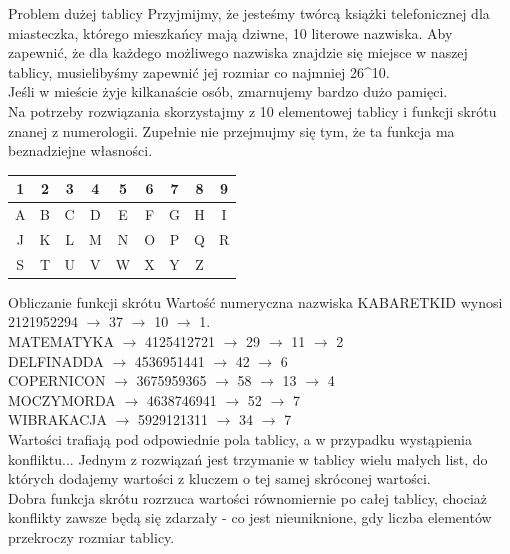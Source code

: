 \begin{frame}{Problem dużej tablicy}
    Przyjmijmy, że jesteśmy twórcą książki telefonicznej dla miasteczka, którego mieszkańcy mają
    dziwne, 10 literowe nazwiska. Aby zapewnić, że dla każdego możliwego nazwiska znajdzie się
    miejsce w naszej tablicy, musielibyśmy zapewnić jej rozmiar co najmniej 26^{10}. \\
    Jeśli w mieście żyje kilkanaście osób, zmarnujemy bardzo dużo pamięci. \\
    Na potrzeby rozwiązania skorzystajmy z 10 elementowej tablicy i funkcji skrótu znanej z numerologii.
    Zupełnie nie przejmujmy się tym, że ta funkcja ma beznadziejne własności.
    \begin{table}
        \centering
        \begin{tabular}{|c|c|c|c|c|c|c|c|c|}
            \hline
            1 & 2 & 3 & 4 & 5 & 6 & 7 & 8 & 9 \\
            \hline
            A & B & C & D & E & F & G & H & I \\
            J & K & L & M & N & O & P & Q & R \\
            S & T & U & V & W & X & Y & Z & \\
            \hline
        \end{tabular}
    \end{table}
\end{frame}
\begin{frame}{Obliczanie funkcji skrótu}
    Wartość numeryczna nazwiska KABARETKID wynosi 2121952294 $\rightarrow$ 37 $\rightarrow$ 10 $\rightarrow$ 1. \\
    MATEMATYKA $\rightarrow$ 4125412721 $\rightarrow$ 29 $\rightarrow$ 11 $\rightarrow$ 2 \\
    DELFINADDA $\rightarrow$ 4536951441 $\rightarrow$ 42 $\rightarrow$ 6 \\
    COPERNICON $\rightarrow$ 3675959365 $\rightarrow$ 58 $\rightarrow$ 13 $\rightarrow$ 4 \\
    MOCZYMORDA $\rightarrow$ 4638746941 $\rightarrow$ 52 $\rightarrow$ 7 \\
    WIBRAKACJA $\rightarrow$ 5929121311 $\rightarrow$ 34 $\rightarrow$ 7 \\
    Wartości trafiają pod odpowiednie pola tablicy, a w przypadku wystąpienia konfliktu...
    Jednym z rozwiązań jest trzymanie w tablicy wielu małych list, do których dodajemy wartości
    z kluczem o tej samej skróconej wartości. \\
    Dobra funkcja skrótu rozrzuca wartości równomiernie po całej tablicy, chociaż konflikty zawsze
    będą się zdarzały - co jest nieuniknione, gdy liczba elementów przekroczy rozmiar tablicy.
\end{frame}
